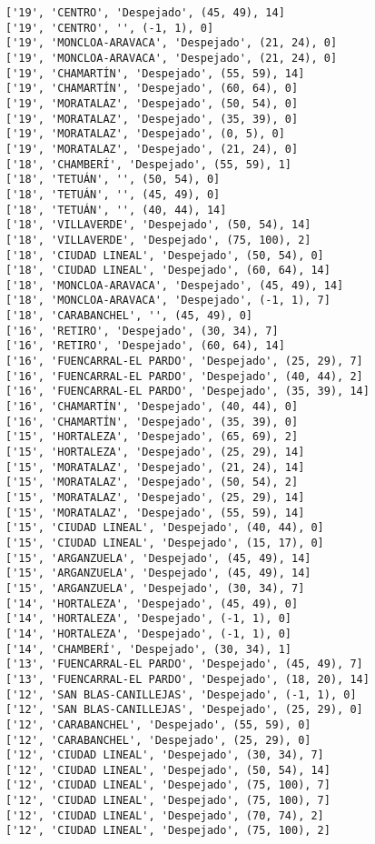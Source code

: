 \documentclass[11pt]{article}
\begin{document}
\begin{Verbatim}[commandchars=\\\{\}]
['19', 'CENTRO', 'Despejado', (45, 49), 14]
['19', 'CENTRO', '', (-1, 1), 0]
['19', 'MONCLOA-ARAVACA', 'Despejado', (21, 24), 0]
['19', 'MONCLOA-ARAVACA', 'Despejado', (21, 24), 0]
['19', 'CHAMARTÍN', 'Despejado', (55, 59), 14]
['19', 'CHAMARTÍN', 'Despejado', (60, 64), 0]
['19', 'MORATALAZ', 'Despejado', (50, 54), 0]
['19', 'MORATALAZ', 'Despejado', (35, 39), 0]
['19', 'MORATALAZ', 'Despejado', (0, 5), 0]
['19', 'MORATALAZ', 'Despejado', (21, 24), 0]
['18', 'CHAMBERÍ', 'Despejado', (55, 59), 1]
['18', 'TETUÁN', '', (50, 54), 0]
['18', 'TETUÁN', '', (45, 49), 0]
['18', 'TETUÁN', '', (40, 44), 14]
['18', 'VILLAVERDE', 'Despejado', (50, 54), 14]
['18', 'VILLAVERDE', 'Despejado', (75, 100), 2]
['18', 'CIUDAD LINEAL', 'Despejado', (50, 54), 0]
['18', 'CIUDAD LINEAL', 'Despejado', (60, 64), 14]
['18', 'MONCLOA-ARAVACA', 'Despejado', (45, 49), 14]
['18', 'MONCLOA-ARAVACA', 'Despejado', (-1, 1), 7]
['18', 'CARABANCHEL', '', (45, 49), 0]
['16', 'RETIRO', 'Despejado', (30, 34), 7]
['16', 'RETIRO', 'Despejado', (60, 64), 14]
['16', 'FUENCARRAL-EL PARDO', 'Despejado', (25, 29), 7]
['16', 'FUENCARRAL-EL PARDO', 'Despejado', (40, 44), 2]
['16', 'FUENCARRAL-EL PARDO', 'Despejado', (35, 39), 14]
['16', 'CHAMARTÍN', 'Despejado', (40, 44), 0]
['16', 'CHAMARTÍN', 'Despejado', (35, 39), 0]
['15', 'HORTALEZA', 'Despejado', (65, 69), 2]
['15', 'HORTALEZA', 'Despejado', (25, 29), 14]
['15', 'MORATALAZ', 'Despejado', (21, 24), 14]
['15', 'MORATALAZ', 'Despejado', (50, 54), 2]
['15', 'MORATALAZ', 'Despejado', (25, 29), 14]
['15', 'MORATALAZ', 'Despejado', (55, 59), 14]
['15', 'CIUDAD LINEAL', 'Despejado', (40, 44), 0]
['15', 'CIUDAD LINEAL', 'Despejado', (15, 17), 0]
['15', 'ARGANZUELA', 'Despejado', (45, 49), 14]
['15', 'ARGANZUELA', 'Despejado', (45, 49), 14]
['15', 'ARGANZUELA', 'Despejado', (30, 34), 7]
['14', 'HORTALEZA', 'Despejado', (45, 49), 0]
['14', 'HORTALEZA', 'Despejado', (-1, 1), 0]
['14', 'HORTALEZA', 'Despejado', (-1, 1), 0]
['14', 'CHAMBERÍ', 'Despejado', (30, 34), 1]
['13', 'FUENCARRAL-EL PARDO', 'Despejado', (45, 49), 7]
['13', 'FUENCARRAL-EL PARDO', 'Despejado', (18, 20), 14]
['12', 'SAN BLAS-CANILLEJAS', 'Despejado', (-1, 1), 0]
['12', 'SAN BLAS-CANILLEJAS', 'Despejado', (25, 29), 0]
['12', 'CARABANCHEL', 'Despejado', (55, 59), 0]
['12', 'CARABANCHEL', 'Despejado', (25, 29), 0]
['12', 'CIUDAD LINEAL', 'Despejado', (30, 34), 7]
['12', 'CIUDAD LINEAL', 'Despejado', (50, 54), 14]
['12', 'CIUDAD LINEAL', 'Despejado', (75, 100), 7]
['12', 'CIUDAD LINEAL', 'Despejado', (75, 100), 7]
['12', 'CIUDAD LINEAL', 'Despejado', (70, 74), 2]
['12', 'CIUDAD LINEAL', 'Despejado', (75, 100), 2]

\end{Verbatim}
\end{document}
